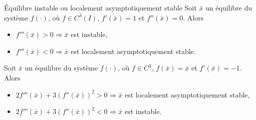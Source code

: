         \begin{theorem}{Équilibre instable ou localement asymptotiquement stable}
            Soit $\bar{x}$ un équilibre du système $f(\cdot)$, où $f \in C^3(I)$, $f'(\bar{x}) = 1$ et $f''(\bar{x}) = 0$. Alors
            \begin{itemize}
                \item $f'''(\bar{x}) > 0 \Rightarrow \bar{x}$ est instable,
                \item $f'''(\bar{x}) < 0 \Rightarrow \bar{x}$ est localement asymptotiquement stable.
            \end{itemize}
            
            Soit $\bar{x}$ un équilibre du système $f(\cdot)$, où $f \in C^3$, $f(\bar{x}) = \bar{x}$ et $f'(\bar{x}) = -1$. Alors
            \begin{itemize}
                \item $2f'''(\bar{x}) + 3 (f''(\bar{x}))^2 > 0 \Rightarrow \bar{x}$ est localement asymptotiquement stable,
                \item $2f'''(\bar{x}) + 3 (f''(\bar{x}))^2 < 0 \Rightarrow \bar{x}$ est instable.
            \end{itemize}
        \end{theorem}

